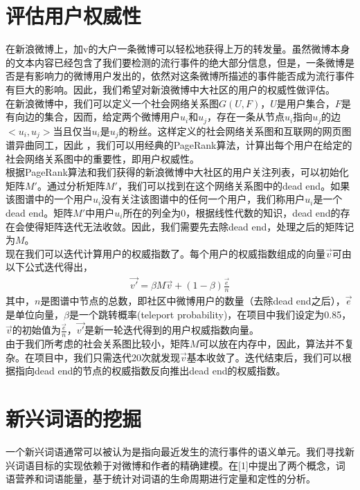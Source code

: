 \documentclass[a4paper]{article}
\begin{document}
\section{评估用户权威性}
在新浪微博上，加v的大户一条微博可以轻松地获得上万的转发量。虽然微博本身的文本内容已经包含了我们要检测的流行事件的绝大部分信息，但是，一条微博是否是有影响力的微博用户发出的，依然对这条微博所描述的事件能否成为流行事件有巨大的影响。因此，我们希望对新浪微博中大社区的用户的权威性做评估。\\
\indent 在新浪微博中，我们可以定义一个社会网络关系图$G(U,F)$，$U$是用户集合，$F$是有向边的集合，因而，给定两个微博用户$u_i$和$u_j$，存在一条从节点$u_i$指向$u_j$的边$<u_i,u_j>$当且仅当$u_i$是$u_j$的粉丝。这样定义的社会网络关系图和互联网的网页图谱异曲同工，因此 ，我们可以用经典的PageRank算法，计算出每个用户在给定的社会网络关系图中的重要性，即用户权威性。\\
\indent 根据PageRank算法和我们获得的新浪微博中大社区的用户关注列表，可以初始化矩阵$M'$。通过分析矩阵$M'$，我们可以找到在这个网络关系图中的dead end。如果该图谱中的一个用户$u_i$没有关注该图谱中的任何一个用户，我们称用户$u_i$是一个dead end。矩阵$M'$中用户$u_i$所在的列全为0，根据线性代数的知识，dead end的存在会使得矩阵迭代无法收敛。因此，我们需要先去除dead end，处理之后的矩阵记为$M$。\\
\indent 现在我们可以迭代计算用户的权威指数了。每个用户的权威指数组成的向量$\vec{v}$可由以下公式迭代得出，
\begin{align}
    \vec{v'}=\beta M\vec{v}+(1-\beta) \frac{\vec{e}} {n}
\end{align}
其中，$n$是图谱中节点的总数，即社区中微博用户的数量（去除dead end之后），$\vec{e}$是单位向量，$\beta$是一个跳转概率(teleport probability)，在项目中我们设定为0.85，$\vec{v}$的初始值为$\frac{\vec{e}} {n}$，$\vec{v'}$是新一轮迭代得到的用户权威指数向量。\\
\indent 由于我们所考虑的社会关系图比较小，矩阵$M$可以放在内存中，因此，算法并不复杂。在项目中，我们只需迭代20次就发现$\vec{v}$基本收敛了。迭代结束后，我们可以根据指向dead end的节点的权威指数反向推出dead end的权威指数。



\section{新兴词语的挖掘}
一个新兴词语通常可以被认为是指向最近发生的流行事件的语义单元。我们寻找新兴词语目标的实现依赖于对微博和作者的精确建模。在[1]中提出了两个概念，词语营养和词语能量，基于统计对词语的生命周期进行定量和定性的分析。
\end{document}
